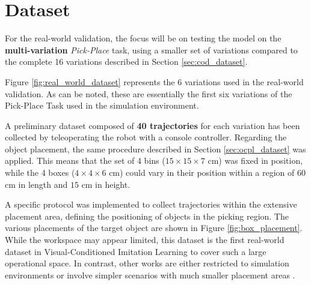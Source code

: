 \section{Dataset}
\label{sec:real_world_dataset}
For the real-world validation, the focus will be on testing the model on the \textbf{multi-variation} \textit{Pick-Place} task, using a smaller set of variations compared to the complete 16 variations described in Section \ref{sec:cod_dataset}.



Figure \ref{fig:real_world_dataset} represents the 6 variations used in the real-world validation. As can be noted, these are essentially the first six variations of the Pick-Place Task used in the simulation environment.

A preliminary dataset composed of \textbf{40 trajectories} for each variation has been collected by teleoperating the robot with a console controller. Regarding the object placement, the same procedure described in Section \ref{sec:ocpl_dataset} was applied. This means that the set of 4 bins ($15 \times 15 \times 7$ cm) was fixed in position, while the 4 boxes ($4 \times 4 \times 6$ cm) could vary in their position within a region of $60$ cm in length and $15$ cm in height. 

A specific protocol was implemented to collect trajectories within the extensive placement area, defining the positioning of objects in the picking region. The various placements of the target object are shown in Figure \ref{fig:box_placement}. While the workspace may appear limited, this dataset is the first real-world dataset in Visual-Conditioned Imitation Learning to cover such a large operational space. In contrast, other works are either restricted to simulation environments \cite{dasari2021transformers_one_shot,mandi2022towards_more_generalizable_one_shot} or involve simpler scenarios with much smaller placement areas \cite{mandlekar2022matters}.

